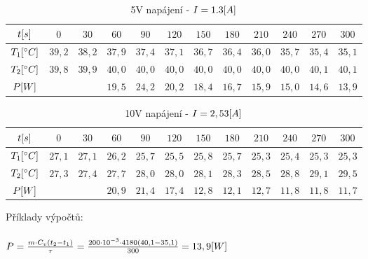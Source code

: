 \documentclass{article}
\begin{document}
\begin{minipage}[t]{\textwidth}
  \begin{table}[H]
    \centering
    \begin{tabular}{|c|c|c|c|c|c|c|c|c|c|c|c|}
      \hline
      \(t\-[s]\)	                & \(0\)     & \(30\)    & \(60\)    & \(90\)    & \(120\)   & \(150\)   & \(180\)   & \(210\)   & \(240\)   & \(270\)   & \(300\)   \\ \hline
      \(T_{1}\-[^\circ C]\)       & \(39,2\)  & \(38,2\)  & \(37,9\)  & \(37,4\)  & \(37,1\)  & \(36,7\)  & \(36,4\)  & \(36,0\)  & \(35,7\)  & \(35,4\)  & \(35,1\)  \\ \hline
      \(T_{2}\-[^\circ C]\)       & \(39,8\)  & \(39,9\)  & \(40,0\)  & \(40,0\)  & \(40,0\)  & \(40,0\)  & \(40,0\)  & \(40,0\)  & \(40,0\)  & \(40,1\)  & \(40,1\)  \\ \hline
      \(P\-[W]\)                  &           &           & \(19,5\)  & \(24,2\)  & \(20,2\)  & \(18,4\)  & \(16,7\)  & \(15,9\)  & \(15,0\)  & \(14,6\)  & \(13,9\)  \\ \hline
    \end{tabular}
    \caption{\label{tabulka_mereni-5v} 5V napájení - \(I=1.3\-[A]\)}
  \end{table}
  \begin{table}[H]
    \centering
    \begin{tabular}{|c|c|c|c|c|c|c|c|c|c|c|c|}
      \hline
      \(t\-[s]\)	                & \(0\)     & \(30\)    & \(60\)    & \(90\)    & \(120\)   & \(150\)   & \(180\)   & \(210\)   & \(240\)   & \(270\)   & \(300\)   \\ \hline
      \(T_{1}\-[^\circ C]\)       & \(27,1\)  & \(27,1\)  & \(26,2\)  & \(25,7\)  & \(25,5\)  & \(25,8\)  & \(25,7\)  & \(25,3\)  & \(25,4\)  & \(25,3\)  & \(25,3\)  \\ \hline
      \(T_{2}\-[^\circ C]\)       & \(27,3\)  & \(27,4\)  & \(27,7\)  & \(28,0\)  & \(28,0\)  & \(28,1\)  & \(28,3\)  & \(28,5\)  & \(28,8\)  & \(29,1\)  & \(29,5\)  \\ \hline
      \(P\-[W]\)                  &           &           & \(20,9\)  & \(21,4\)  & \(17,4\)  & \(12,8\)  & \(12,1\)  & \(12,7\)  & \(11,8\)  & \(11,8\)  & \(11,7\)  \\ \hline
    \end{tabular}
    \caption{\label{tabulka_mereni-10v} 10V napájení - \(I=2,53\-[A]\)}
  \end{table}
\end{minipage}
Příklady výpočtů: \\
\\
\large
\(
  P = \frac{m \cdot C_v (t_2 - t_1)}{\tau} = \frac{200 \cdot 10^{-3} \cdot 4180 (40,1 - 35,1)}{300} = 13,9\-[W]
\)
\normalsize \\
\end{document}
